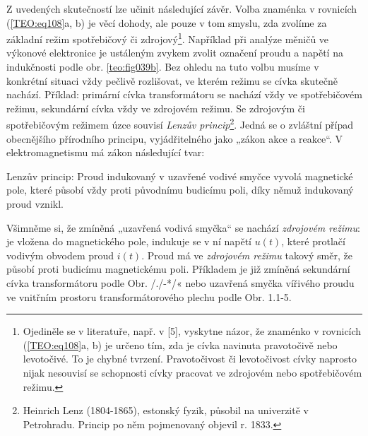 
    Z uvedených skutečností lze učinit následující závěr. Volba znaménka v rovnicích
    (\ref{TEO:eq108}a, b) je věcí dohody, ale pouze v tom smyslu, zda zvolíme za základní režim
    spotřebičový či zdrojový\footnote{Ojediněle se v literatuře, např. v [5], vyskytne názor, že
    znaménko v rovnicích (\ref{TEO:eq108}a, b) je určeno tím, zda je cívka navinuta pravotočivě nebo
    levotočivé. To je chybné tvrzení. Pravotočivost či levotočivost cívky naprosto nijak nesouvisí
    se schopnosti cívky pracovat ve zdrojovém nebo spotřebičovém režimu.}. Například při analýze
    měničů ve výkonové elektronice je ustáleným zvykem zvolit označení proudu a napětí na
    indukčnosti podle obr. \ref{teo:fig039b}. Bez ohledu na tuto volbu musíme v konkrétní situaci
    vždy pečlivě rozlišovat, ve kterém režimu se cívka skutečně nachází. Příklad: primární cívka
    transformátoru se nachází vždy ve spotřebičovém režimu, sekundární cívka vždy ve zdrojovém
    režimu. Se zdrojovým či spotřebičovým režimem úzce souvisí \emph{Lenzův
    princip}\footnote{Heinrich Lenz (1804-1865), estonský fyzik, působil na univerzitě v Petrohradu.
    Princip po něm pojmenovaný objevil r. 1833.}. Jedná se o zvláštní případ obecnějšího přírodního
    principu, vyjádřitelného jako „zákon akce a reakce“. V elektromagnetismu má zákon následující
    tvar:

    Lenzův princip: Proud indukovaný v uzavřené vodivé smyčce vyvolá magnetické pole, které působí
    vždy proti původnímu budicímu poli, díky němuž indukovaný proud vznikl.

    Všimněme si, že zmíněná „uzavřená vodivá smyčka“ se nachází \emph{zdrojovém režimu}: je vložena
    do magnetického pole, indukuje se v ní napětí \(u(t)\), které protlačí vodivým obvodem proud
    \(i(t)\). Proud má ve \emph{zdrojovém režimu} takový směr, že působí proti budicímu magnetickému
    poli. Příkladem je již zmíněná sekundární cívka transformátoru podle Obr. /./-*/« nebo uzavřená
    smyčka vířivého proudu ve vnitřním prostoru transformátorového plechu podle Obr. 1.1-5.


